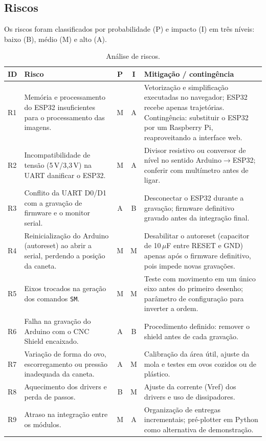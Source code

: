 \documentclass[10pt,a4paper]{article}
\begin{document}
\subsection{Riscos}

Os riscos foram classificados por probabilidade (P) e impacto (I) em três níveis: baixo (B), médio (M) e alto (A).

\begin{table}[htbp]
\centering
\caption{Análise de riscos.}
\label{tab:riscos}
\small
\begin{tabularx}{\linewidth}{@{}l X c c X@{}}
\toprule
\textbf{ID} & \textbf{Risco} & \textbf{P} & \textbf{I} & \textbf{Mitigação / contingência} \\
\midrule
R1 & Memória e processamento do ESP32 insuficientes para o processamento das imagens. & M & A & Vetorização e simplificação executadas no navegador; ESP32 recebe apenas trajetórias. Contingência: substituir o ESP32 por um Raspberry Pi, reaproveitando a interface web. \\
R2 & Incompatibilidade de tensão (5\,V/3,3\,V) na UART danificar o ESP32. & M & A & Divisor resistivo ou conversor de nível no sentido Arduino$\rightarrow$ESP32; conferir com multímetro antes de ligar. \\
R3 & Conflito da UART D0/D1 com a gravação de firmware e o monitor serial. & A & B & Desconectar o ESP32 durante a gravação; firmware definitivo gravado antes da integração final. \\
R4 & Reinicialização do Arduino (autoreset) ao abrir a serial, perdendo a posição da caneta. & M & M & Desabilitar o autoreset (capacitor de 10\,$\mu$F entre RESET e GND) apenas após o firmware definitivo, pois impede novas gravações. \\
R5 & Eixos trocados na geração dos comandos \texttt{SM}. & M & M & Teste com movimento em um único eixo antes do primeiro desenho; parâmetro de configuração para inverter a ordem. \\
R6 & Falha na gravação do Arduino com o CNC Shield encaixado. & A & B & Procedimento definido: remover o shield antes de cada gravação. \\
R7 & Variação de forma do ovo, escorregamento ou pressão inadequada da caneta. & A & M & Calibração da área útil, ajuste da mola e testes em ovos cozidos ou de plástico. \\
R8 & Aquecimento dos drivers e perda de passos. & B & M & Ajuste da corrente (Vref) dos drivers e uso de dissipadores. \\
R9 & Atraso na integração entre os módulos. & M & A & Organização de entregas incrementais; pré-plotter em Python como alternativa de demonstração. \\
\bottomrule
\end{tabularx}
\end{table}
\end{document}
